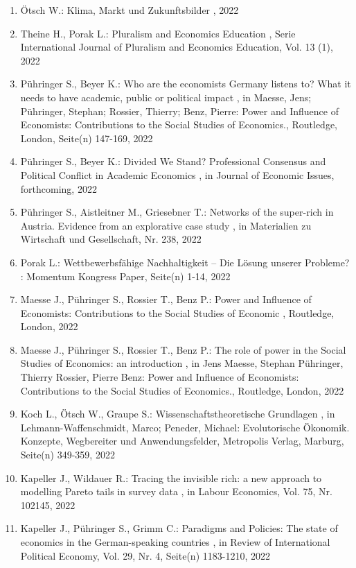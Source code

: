  \begin{enumerate}[leftmargin=*, labelsep=0.5cm] 
	 \item Ötsch W.:  Klima, Markt und Zukunftsbilder  , 2022
	 \item Theine H., Porak L.:  Pluralism and Economics Education  , Serie International Journal of Pluralism and Economics Education, Vol. 13 (1), 2022
	 \item Pühringer S., Beyer K.:  Who are the economists Germany listens to? What it needs to have academic, public or political impact  , in Maesse, Jens; Pühringer, Stephan; Rossier, Thierry; Benz, Pierre: Power and Influence of Economists: Contributions to the Social Studies of Economics., Routledge, London, Seite(n) 147-169, 2022
	 \item Pühringer S., Beyer K.:  Divided We Stand? Professional Consensus and Political Conflict in Academic Economics  , in Journal of Economic Issues, forthcoming, 2022
	 \item Pühringer S., Aistleitner M., Griesebner T.:  Networks of the super-rich in Austria. Evidence from an explorative case study  , in Materialien zu Wirtschaft und Gesellschaft, Nr. 238, 2022
	 \item Porak L.:  Wettbewerbsfähige Nachhaltigkeit – Die Lösung unserer Probleme?  : Momentum Kongress Paper, Seite(n) 1-14, 2022
	 \item Maesse J., Pühringer S., Rossier T., Benz P.:  Power and Influence of Economists: Contributions to the Social Studies of Economic  , Routledge, London, 2022
	 \item Maesse J., Pühringer S., Rossier T., Benz P.:  The role of power in the Social Studies of Economics: an introduction  , in Jens Maesse, Stephan Pühringer, Thierry Rossier,  Pierre Benz: Power and Influence of Economists: Contributions to the Social Studies of Economics., Routledge, London, 2022
	 \item Koch L., Ötsch W., Graupe S.:  Wissenschaftstheoretische Grundlagen  , in Lehmann-Waffenschmidt, Marco; Peneder, Michael: Evolutorische Ökonomik. Konzepte, Wegbereiter und Anwendungsfelder, Metropolis Verlag, Marburg, Seite(n) 349-359, 2022
	 \item Kapeller J., Wildauer R.:  Tracing the invisible rich: a new approach to modelling Pareto tails in survey data  , in Labour Economics, Vol. 75, Nr. 102145, 2022
	 \item Kapeller J., Pühringer S., Grimm C.:  Paradigms and Policies: The state of economics in the German-speaking countries  , in Review of International Political Economy, Vol. 29, Nr. 4, Seite(n) 1183-1210, 2022

\end{enumerate}
